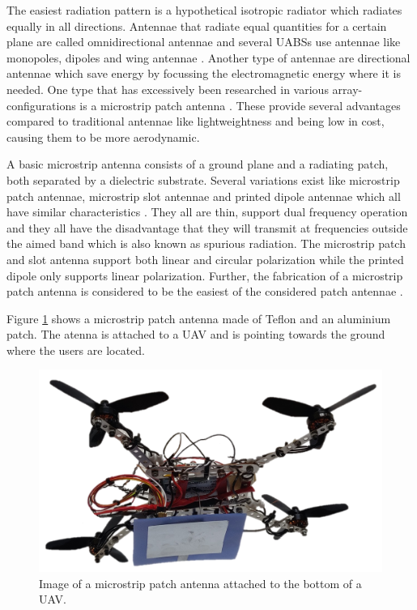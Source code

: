 \documentclass[twocolumn]{phdsymp} %
\begin{document}
The easiest radiation pattern is a hypothetical isotropic radiator which radiates equally in all directions.
Antennae that radiate equal quantities for a certain plane are called omnidirectional antennae \cite{U12} and several 
\gls{UABS}s use antennae like monopoles, dipoles and wing antennae \cite{A4,A10,A11,A12}.
Another type of antennae are directional antennae which save energy by focussing the electromagnetic energy where it 
is needed. One type 
that has excessively been researched in various array-configurations is a microstrip patch antenna \cite{A5,A6,A8}.
These provide several advantages compared to traditional antennae \cite{J13_microstripadvantages,J14_antennadesign}
like lightweightness and being low in cost, causing them to be more aerodynamic. 

A basic microstrip antenna consists of a ground plane and
a radiating patch, both separated by a dielectric substrate. 
Several variations exist like microstrip patch antennae, microstrip slot antennae and printed dipole antennae which
all have similar characteristics \cite{J13_microstripadvantages,J14_antennadesign}. 
They all are thin, support dual frequency operation and they all have the disadvantage that 
they 
will transmit at frequencies outside the aimed band which is also known as
spurious radiation. The microstrip patch and slot antenna support both linear
and circular polarization while the printed dipole only supports linear polarization. 
Further, the fabrication of a microstrip patch antenna is considered to be the easiest 
of the considered patch antennae \cite{J13_microstripadvantages}. 

Figure \ref{fig:exampleDrone} shows a microstrip patch antenna made of Teflon and an 
aluminium patch. The atenna is attached to a \gls{UAV} and is pointing towards the ground where the users are located.

\begin{figure}[h]
\centering
  \includegraphics[width=0.9\linewidth]{drone.png}
  \caption{Image of a microstrip patch antenna attached to the bottom of a \gls{UAV}. }
  \label{fig:exampleDrone}
\end{figure}
\end{document}
